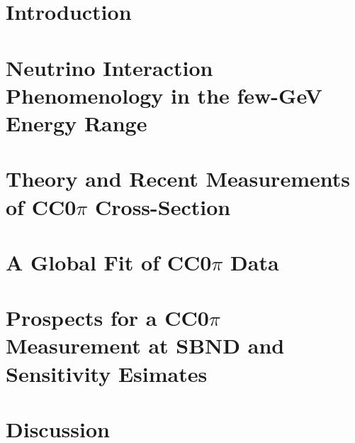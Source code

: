 \documentclass[11pt]{article}
\begin{document}
\section{Introduction}
\label{sec:intro}



\section{Neutrino Interaction Phenomenology in the few-GeV Energy Range}
\label{sec:NIP}



\section{Theory and Recent Measurements of CC0\( \pi \) Cross-Section}
\label{sec:XSec}



\section{A Global Fit of CC0\( \pi \) Data}
\label{sec:GF}



\section{Prospects for a CC0\( \pi \) Measurement at SBND and Sensitivity Esimates}
\label{sec:Prospects}




\section{Discussion}



\newpage





\end{document}

